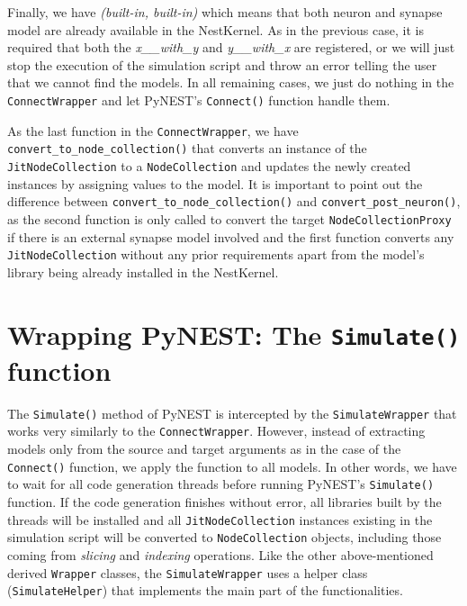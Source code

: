 Finally, we have \emph{(built-in, built-in)} which means that both neuron and synapse model are already available in the NestKernel. As in the previous case, it is required that both the \emph{x\_\_with\_y} and \emph{y\_\_with\_x} are registered, or we will just stop the execution of the simulation script and throw an error telling the user that we cannot find the models. In all remaining cases, we just do nothing in the \texttt{ConnectWrapper} and let PyNEST's \texttt{Connect()} function handle them. 

As the last function in the \texttt{ConnectWrapper}, we have \texttt{convert\_to\_node\_collection()} that converts an instance of the \texttt{JitNodeCollection} to a \texttt{NodeCollection} and updates the newly created instances by assigning values to the model. It is important to point out the difference between \texttt{convert\_to\_node\_collection()} and \texttt{convert\_post\_neuron()}, as the second function is only called to convert the target \texttt{NodeCollectionProxy} if there is an external synapse model involved and the first function converts any \texttt{JitNodeCollection} without any prior requirements apart from the model's library being already installed in the NestKernel.

\section{Wrapping PyNEST: The \texttt{Simulate()} function}

The \texttt{Simulate()} method of PyNEST is intercepted by the \texttt{SimulateWrapper} that works very similarly to the \texttt{ConnectWrapper}. However, instead of extracting models only from the source and target arguments as in the case of the \texttt{Connect()} function, we apply the function to all models. In other words, we have to wait for all code generation threads before running PyNEST's \texttt{Simulate()} function. If the code generation finishes without error, all libraries built by the threads will be installed and all \texttt{JitNodeCollection} instances existing in the simulation script will be converted to \texttt{NodeCollection} objects, including those coming from \emph{slicing} and \emph{indexing} operations. Like the other above-mentioned derived \texttt{Wrapper} classes, the \texttt{SimulateWrapper} uses a helper class (\texttt{SimulateHelper}) that implements the main part of the functionalities.

